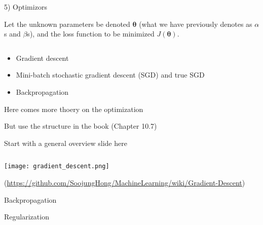 \documentclass[
  10pt,
  ignorenonframetext,
]{beamer}
\begin{document}
\begin{frame}
\begin{block}{5) Optimizors}
\protect\hypertarget{optimizors}{}
\(~\)

Let the unknown parameters be denoted \({\boldsymbol \theta}\) (what we
have previously denotes as \(\alpha\)s and \(\beta\)s), and the loss
function to be minimized \(J({\boldsymbol \theta})\).

\(~\)

\begin{itemize}
\item
  Gradient descent
\item
  Mini-batch stochastic gradient descent (SGD) and true SGD
\item
  Backpropagation
\end{itemize}
\end{block}
\end{frame}

\begin{frame}
Here comes more thoery on the optimization

But use the structure in the book (Chapter 10.7)

Start with a general overview slide here

\(~\)

\center

\texttt{[image: gradient\_descent.png]}

\tiny (\url{https://github.com/SoojungHong/MachineLearning/wiki/Gradient-Descent})
\end{frame}

\begin{frame}
\begin{block}{Backpropagation}
\protect\hypertarget{backpropagation}{}
\end{block}
\end{frame}

\begin{frame}
\begin{block}{Regularization}
\protect\hypertarget{regularization}{}
\end{block}
\end{frame}
\end{document}
